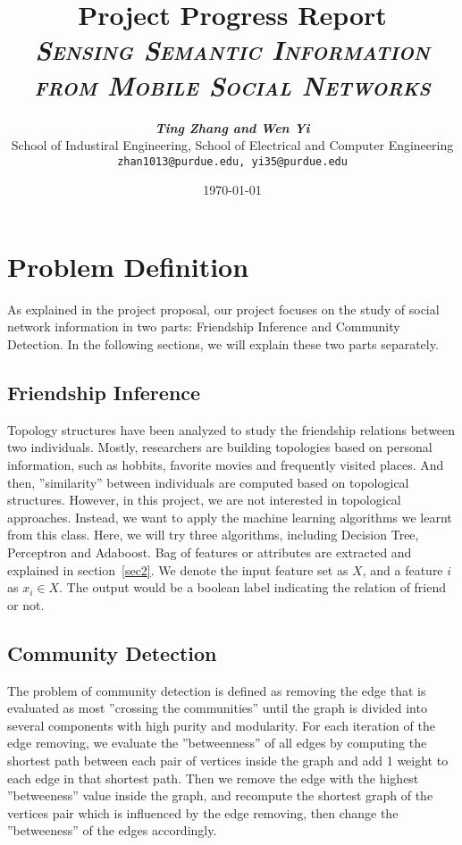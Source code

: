 \documentclass[11pt]{article}
\title{
\textbf{Project Progress Report} \\ \textsc{\textit{Sensing Semantic Information from Mobile Social Networks}} \\
}
\author{
	\textbf{\textit{Ting Zhang and Wen Yi}} \\
	School of Industiral Engineering, School of Electrical and Computer Engineering\\
	\texttt{zhan1013@purdue.edu, yi35@purdue.edu}
}
\date{\today}
\begin{document}
\maketitle


\section{Problem Definition}
As explained in the project proposal, our project focuses on the study of social network information in two parts:  Friendship Inference and Community Detection. In the following sections, we will explain these two parts separately.
\subsection{Friendship Inference}
Topology structures have been analyzed to study the friendship relations between two individuals. Mostly, researchers are building topologies based on personal information, such as hobbits, favorite movies and frequently visited places. And then, ''similarity'' between individuals are computed based on topological structures. However, in this project, we are not interested in topological approaches. Instead, we want to apply the machine learning algorithms we learnt from this class. Here, we will try three algorithms, including Decision Tree, Perceptron and Adaboost. Bag of features or attributes are extracted and explained in section~\ref{sec2}. We denote the input feature set as \(X\), and a feature \(i\) as \(x_i \in X\). The output would be a boolean label indicating the relation of friend or not.

\subsection{Community Detection}
The problem of community detection is defined as removing the edge that is evaluated as most ''crossing the communities'' until the graph is divided into several components with high purity and modularity. For each iteration of the edge removing, we evaluate the ''betweenness'' of all edges by computing the shortest path between each pair of vertices inside the graph and add 1 weight to each edge in that shortest path. Then we remove the edge with the highest ''betweeness'' value inside the graph, and recompute the shortest graph of the vertices pair which is influenced by the edge removing, then change the ''betweeness'' of the edges accordingly.
\end{document}
